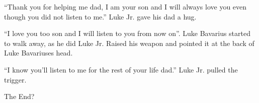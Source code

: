 ``Thank you for helping me dad, I am your son and I will
always love you even though you did not listen to me.'' Luke
Jr. gave his dad a hug.



``I love you too son and I will listen to you from now
on''. Luke Bavarius started to walk away, as he did Luke Jr.
Raised his weapon and pointed it at the back of Luke Bavariuses
head.



``I know you'll listen to me for the rest of your life
dad.'' Luke Jr. pulled the trigger.



The End?
 



